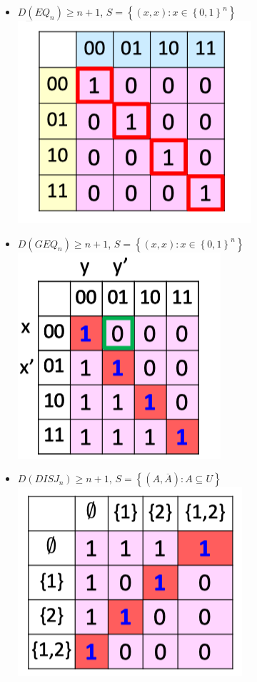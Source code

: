 \documentclass[10pt,landscape,a4paper]{article}
\newcommand{\set}[1]{\left \{ #1 \right \}}
\begin{document}
\begin{multicols*}{3}
\begin{itemize}
    \item $D(EQ_n) \geq n + 1$, $S = \set{(x, x): x \in \set{0, 1}^n}$ \\
    \includegraphics[scale=0.5]{eq_2}
    \item $D(GEQ_n) \geq n + 1$, $S = \set{(x, x): x \in \set{0, 1}^n}$ \\
    \includegraphics[scale=0.5]{gte_2}
    \item $D(DISJ_n) \geq n + 1$, $S = \set{(A, \overline{A}): A \subseteq U}$ \\
    \includegraphics[scale=0.5]{disj_2}
\end{itemize}

\end{multicols*}
\end{document}

